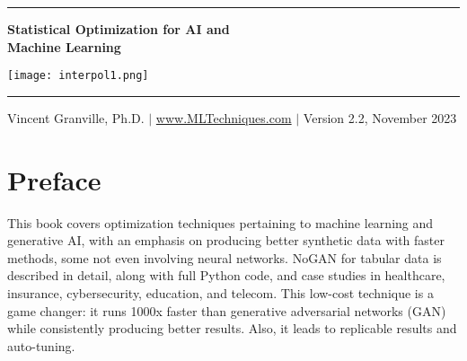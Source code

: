\documentclass[oneside,10pt]{book}
\begin{document}
\hypersetup{linkcolor=blue}



\baselineskip
\thispagestyle{empty}
\hspace{0pt}
\vfill
\begin{center}
\rule{0.90\textwidth}{.4pt}
\end{center}

\begin{center}
{\Huge \bf{Statistical Optimization for AI and\\\vspace{0.5ex}Machine Learning} }  
\end{center}


\baselineskip
\addvspace{1cm}
\begin{center}
\texttt{[image: interpol1.png]}  
\end{center}
\addvspace{1cm}
\begin{center}
\rule{0.90\textwidth}{.4pt}
\end{center}
\begin{center}
Vincent Granville, Ph.D. $|$ \href{https://mltechniques.com/}{www.MLTechniques.com} $|$ Version 2.2, November 2023 
\end{center}

\hypersetup{linkcolor=red} %

\vfill
\hspace{0pt}
\pagebreak

\chapter*{Preface} %

This book covers 
 optimization techniques pertaining to machine learning and generative AI, with an emphasis on producing better synthetic data with faster methods, some not even involving neural networks. NoGAN for tabular data is described in detail, along with full Python code, and case studies in healthcare, insurance, cybersecurity, education, and telecom. This low-cost technique is a game changer: it runs 1000x faster than generative adversarial networks (GAN) while consistently producing better results. Also, it leads to replicable results and auto-tuning.
\end{document}
